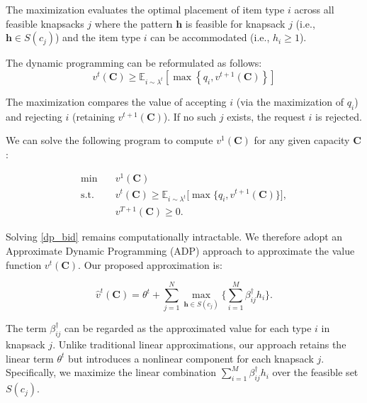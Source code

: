 The maximization evaluates the optimal placement of item type $i$ across all feasible knapsacks $j$ where the pattern $\bm{h}$ is feasible for knapsack $j$ (i.e., $\bm{h} \in S(c_{j})$) and the item type $i$ can be accommodated (i.e., $h_{i} \geq 1$). 


The dynamic programming can be reformulated as follows:
\begin{equation}
v^t(\bm{C}) \geq \mathbb{E}_{i \sim \lambda^t}\left[
\max \left\{q_{i}, v^{t+1}(\bm{C})\right\}
\right]
\end{equation}



The maximization compares the value of accepting $i$ (via the maximization of $q_{i}$) and rejecting $i$ (retaining $v^{t+1}(\bm{C})$). If no such $j$ exists, the request $i$ is rejected.


We can solve the following program to compute $v^1(\bm{C})$ for any given capacity $\bm{C}$:

\begin{equation}\label{dp_bid}
    \begin{aligned}
    \min \quad & v^{1}(\bm{C}) \\
    \mathrm{s.t.} \quad & v^{t}(\bm{C}) \geq \mathbb{E}_{i \sim \lambda^t}\Bigg[\max\Big\{ q_{i}, v^{t+1}(\bm{C})\Big\}\Bigg], \\
    & v^{T+1}(\bm{C}) \geq 0.
    \end{aligned}
\end{equation}


Solving \eqref{dp_bid} remains computationally intractable. We therefore adopt an Approximate Dynamic Programming (ADP) approach \citep{adelman2007dynamic} to approximate the value function $v^{t}(\bm{C})$. Our proposed approximation is:

\begin{equation}\label{appro_dp}
    \hat{v}^{t}(\bm{C}) = \theta^{t} + \sum_{j=1}^{N} \max_{\bm{h} \in S(c_{j})} \{\sum_{i=1}^{M} \beta_{ij}^{\dag} h_{i}\}.
\end{equation}


The term $\beta_{ij}^{\dag}$ can be regarded as the approximated value for each type $i$ in knapsack $j$. Unlike traditional linear approximations, our approach retains the linear term $\theta^{t}$ but introduces a nonlinear component for each knapsack $j$. Specifically, we maximize the linear combination $\sum_{i=1}^{M} \beta_{ij}^{\dag} h_{i}$ over the feasible set $S(c_{j})$.

